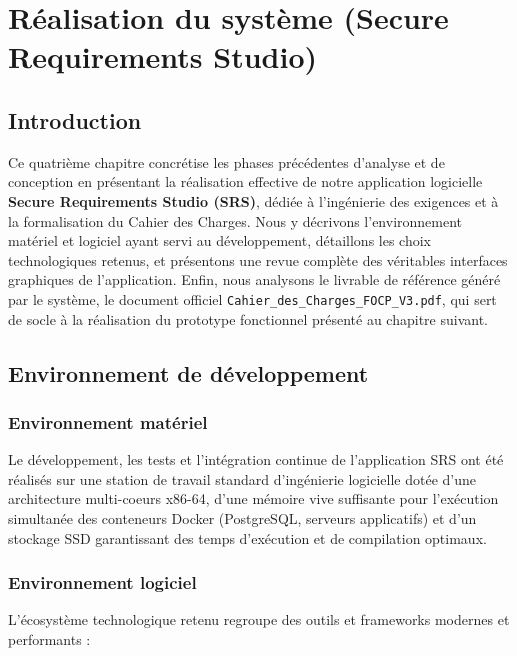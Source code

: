 \chapter{Réalisation du système (Secure Requirements Studio)}

\section{Introduction}

Ce quatrième chapitre concrétise les phases précédentes d'analyse et de conception en présentant la réalisation effective de notre application logicielle \textbf{Secure Requirements Studio (SRS)}, dédiée à l'ingénierie des exigences et à la formalisation du Cahier des Charges. Nous y décrivons l'environnement matériel et logiciel ayant servi au développement, détaillons les choix technologiques retenus, et présentons une revue complète des véritables interfaces graphiques de l'application. Enfin, nous analysons le livrable de référence généré par le système, le document officiel \texttt{Cahier\_des\_Charges\_FOCP\_V3.pdf}, qui sert de socle à la réalisation du prototype fonctionnel présenté au chapitre suivant.

\section{Environnement de développement}

\subsection{Environnement matériel}

Le développement, les tests et l'intégration continue de l'application SRS ont été réalisés sur une station de travail standard d'ingénierie logicielle dotée d'une architecture multi-coeurs x86-64, d'une mémoire vive suffisante pour l'exécution simultanée des conteneurs Docker (PostgreSQL, serveurs applicatifs) et d'un stockage SSD garantissant des temps d'exécution et de compilation optimaux.

\subsection{Environnement logiciel}

L'écosystème technologique retenu regroupe des outils et frameworks modernes et performants :

